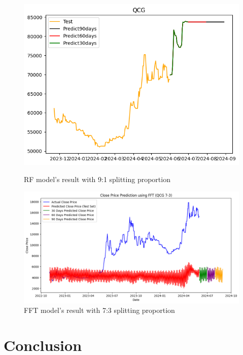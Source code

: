 \documentclass{ieeeojies}
\begin{document}
\begin{figure}[H]
  \centering
  \begin{minipage}{0.23\textwidth}
  \centering
  \includegraphics[width=1\textwidth]{bibliography/Figure/QCGRF_9-1.png}
  \caption{RF model's result with 9:1 splitting proportion}
  \label{fig:1}
  \end{minipage}
  \hfill
  \begin{minipage}{0.23\textwidth}
  \centering
  \includegraphics[width=1\textwidth]{bibliography/Figure/FFT_QCG(7-3).png}
  \caption{FFT model's result with 7:3 splitting proportion}
  \label{fig:2}
  \end{minipage}
\end{figure}

\section{Conclusion}
\end{document}
